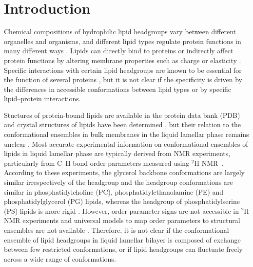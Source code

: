 \documentclass[aps,prl,superscriptaddress,twocolumn]{revtex4}
\begin{document}


\section{Introduction}

Chemical compositions of hydrophilic lipid headgroups vary between different
organelles and organisms, and different lipid types
regulate protein functions in many different ways \cite{lee03,vanmeer08}.
Lipids can directly bind to proteins or indirectly affect protein
functions by altering membrane properties such as charge or elasticity \cite{lee03,lemmon08}.
Specific interactions with certain lipid headgroups
are known to be essential for the function of several proteins \cite{lee11,lemmon08},
but it is not clear if the specificity is driven by the
differences in accessible conformations between lipid types or
by specific lipid--protein interactions.

Stuctures of protein-bound lipids are available in the protein data bank (PDB) \cite{berman00}
and crystal structures of lipids have been determined \cite{buldt81,pascher92},
but their relation to the conformational ensembles in bulk membranes in the liquid lamellar phase remains unclear \cite{marsh13b}.
Most accurate experimental information on conformational ensembles of lipids
in liquid lamellar phase are typically derived from NMR experiments, particularly from 
C--H bond order parameters measured using $^2$H NMR~\cite{seelig77c,davis83,Semchyschyn04}.
According to these experiments, the glycerol backbone conformations are largely similar irrespectively of the headgroup \cite{gally81} and
the headgroup conformations are similar in phosphatidylcholine (PC), phosphatidylethanolamine (PE) and phosphatidylglycerol (PG) lipids,
whereas the headgroup of phosphatidylserine (PS) lipids is more rigid \cite{wohlgemuth80,buldt81}. 
However, order parameter signs are not accessible in $^2$H NMR experiments \cite{ollila16}
and universal models to map order parameters to structural ensembles are not available \cite{pezeshkian18,akutsu20}.
Therefore, it is not clear if the conformational ensemble of lipid headgroups in liquid lamellar bilayer
is composed of exchange between few restricted conformations, or if lipid headgroups can fluctuate freely across a wide range of conformations.
\end{document}
